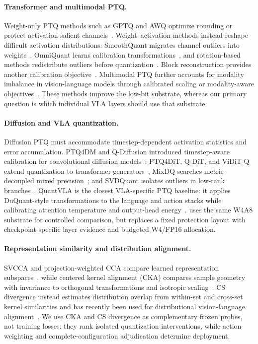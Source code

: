 \paragraph{Transformer and multimodal PTQ.}
Weight-only PTQ methods such as GPTQ and AWQ optimize rounding or protect activation-salient channels~\cite{frantar2022gptq,lin2024awq}. Weight--activation methods instead reshape difficult activation distributions: SmoothQuant migrates channel outliers into weights~\cite{xiao2023smoothquant}, OmniQuant learns calibration transformations~\cite{shao2024omniquant}, and rotation-based methods redistribute outliers before quantization~\cite{ashkboos2024quarot,lin2024duquant,liu2025spinquant,sun2025flatquant,hu2025ostquant}. Block reconstruction provides another calibration objective~\cite{li2021brecq}. Multimodal PTQ further accounts for modality imbalance in vision-language models through calibrated scaling or modality-aware objectives~\cite{wang2024qvlm,li2025mbq}. These methods improve the low-bit substrate, whereas our primary question is which individual VLA layers should use that substrate.

\paragraph{Diffusion and VLA quantization.}
Diffusion PTQ must accommodate timestep-dependent activation statistics and error accumulation. PTQ4DM and Q-Diffusion introduced timestep-aware calibration for convolutional diffusion models~\cite{shang2023ptq4dm,li2023qdiffusion}; PTQ4DiT, Q-DiT, and ViDiT-Q extend quantization to transformer generators~\cite{wu2024ptq4dit,chen2024qdit,zhao2024viditq}; MixDQ searches metric-decoupled mixed precision~\cite{zhao2024mixdq}; and SVDQuant isolates outliers in low-rank branches~\cite{li2024svdquant}. QuantVLA is the closest VLA-specific PTQ baseline: it applies DuQuant-style transformations to the language and action stacks while calibrating attention temperature and output-head energy~\cite{zhang2026quantvla}. \method uses the same W4A8 substrate for controlled comparison, but replaces a fixed protection layout with checkpoint-specific layer evidence and budgeted W4/FP16 allocation.

\paragraph{Representation similarity and distribution alignment.}
SVCCA and projection-weighted CCA compare learned representation subspaces~\cite{raghu2017svcca,morcos2018pwcca}, while centered kernel alignment (CKA) compares sample geometry with invariance to orthogonal transformations and isotropic scaling~\cite{kornblith2019similarity}. CS divergence instead estimates distribution overlap from within-set and cross-set kernel similarities and has recently been used for distributional vision-language alignment~\cite{yin2026csaligner}. We use CKA and CS divergence as complementary frozen probes, not training losses: they rank isolated quantization interventions, while action weighting and complete-configuration adjudication determine deployment.

